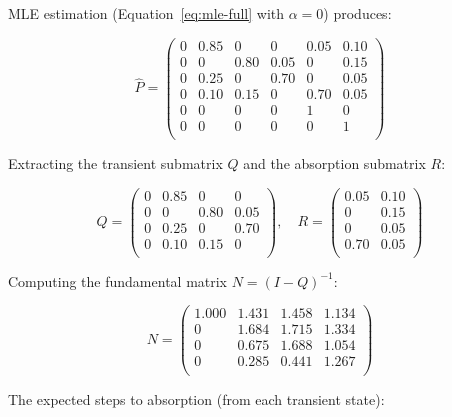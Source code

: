 MLE estimation (Equation~\ref{eq:mle-full} with $\alpha = 0$) produces:

\begin{equation}
\label{eq:example-P}
\hat{P} = \begin{pmatrix}
0    & 0.85 & 0    & 0    & 0.05 & 0.10 \\
0    & 0    & 0.80 & 0.05 & 0    & 0.15 \\
0    & 0.25 & 0    & 0.70 & 0    & 0.05 \\
0    & 0.10 & 0.15 & 0    & 0.70 & 0.05 \\
0    & 0    & 0    & 0    & 1    & 0    \\
0    & 0    & 0    & 0    & 0    & 1    \\
\end{pmatrix}
\end{equation}

Extracting the transient submatrix $Q$ and the absorption submatrix $R$:

\begin{equation}
\label{eq:example-QR}
Q = \begin{pmatrix}
0    & 0.85 & 0    & 0    \\
0    & 0    & 0.80 & 0.05 \\
0    & 0.25 & 0    & 0.70 \\
0    & 0.10 & 0.15 & 0    \\
\end{pmatrix}, \quad
R = \begin{pmatrix}
0.05 & 0.10 \\
0    & 0.15 \\
0    & 0.05 \\
0.70 & 0.05 \\
\end{pmatrix}
\end{equation}

Computing the fundamental matrix $N = (I - Q)^{-1}$:

\begin{equation}
\label{eq:example-N}
N = \begin{pmatrix}
1.000 & 1.431 & 1.458 & 1.134 \\
0     & 1.684 & 1.715 & 1.334 \\
0     & 0.675 & 1.688 & 1.054 \\
0     & 0.285 & 0.441 & 1.267 \\
\end{pmatrix}
\end{equation}

The expected steps to absorption (from each transient state):

